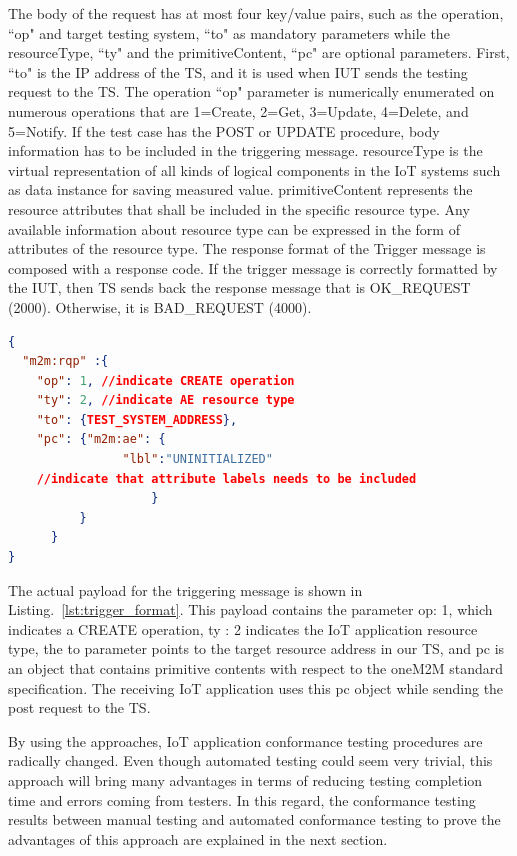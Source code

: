 The body of the request has at most four key/value pairs, such as the operation, ``op" and target testing system, ``to" as mandatory parameters while the resourceType, ``ty" and the primitiveContent, ``pc" are optional parameters. First, ``to" is the IP address of the TS, and it is used when IUT sends the testing request to the TS. The operation ``op" parameter is numerically enumerated on numerous operations that are 1=Create, 2=Get, 3=Update, 4=Delete, and 5=Notify. If the test case has the POST or UPDATE procedure, body information has to be included in the triggering message. resourceType is the virtual representation of all kinds of logical components in the IoT systems such as data instance for saving measured value. primitiveContent represents the resource attributes that shall be included in the specific resource type. Any available information about resource type can be expressed in the form of attributes of the resource type. The response format of the Trigger message is composed with a response code. If the trigger message is correctly formatted by the IUT, then TS sends back the response message that is OK\_REQUEST (2000). Otherwise, it is BAD\_REQUEST (4000). 
\begingroup
\begin{lstlisting}[language=json,firstnumber=1,basicstyle=\ttfamily\footnotesize,backgroundcolor=\color{white},numbersep=1pt, label=lst-trigger, float, caption=Example of TriggerMessage format, label={lst:trigger_format}]
{ 
  "m2m:rqp" :{
    "op": 1, //indicate CREATE operation
    "ty": 2, //indicate AE resource type
    "to": {TEST_SYSTEM_ADDRESS},
    "pc": {"m2m:ae": {
    			"lbl":"UNINITIALIZED" 
    //indicate that attribute labels needs to be included
                	}
          }
      }
}
\end{lstlisting}
\endgroup
The actual payload for the triggering message is shown in Listing.~\ref{lst:trigger_format}. This payload contains the parameter op: 1, which indicates a CREATE operation, ty : 2 indicates the IoT application resource type, the to parameter points to the target resource address in our TS, and pc is an object that contains primitive contents with respect to the oneM2M standard specification. The receiving IoT application uses this pc object while sending the post request to the TS.

By using the approaches, IoT application conformance testing procedures are radically changed. Even though automated testing could seem very trivial, this approach will bring many advantages in terms of reducing testing completion time and errors coming from testers. In this regard, the conformance testing results between manual testing and automated conformance testing to prove the advantages of this approach are explained in the next section.




